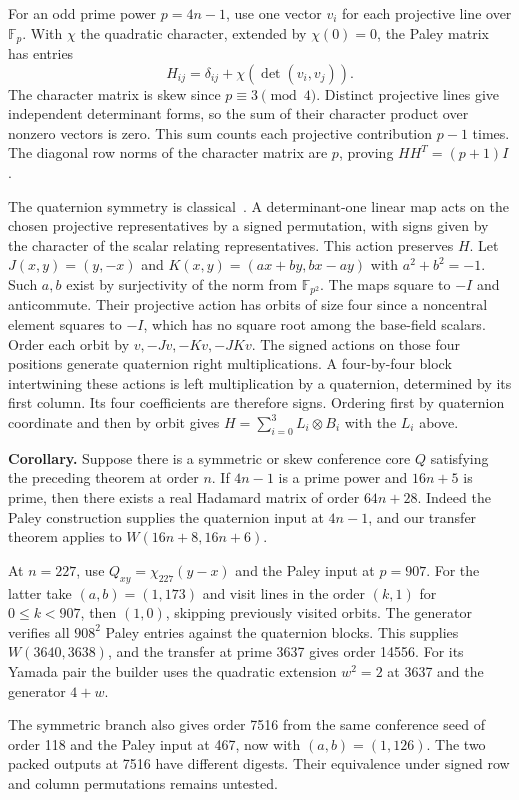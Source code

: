 \documentclass[10pt]{article}
\begin{document}
For an odd prime power $p=4n-1$, use one vector $v_i$ for each projective line over $\mathbb F_p$. With $\chi$ the quadratic character, extended by $\chi(0)=0$, the Paley matrix has entries
\[
 H_{ij}=\delta_{ij}+\chi(\det(v_i,v_j)).
\]
The character matrix is skew since $p\equiv3\pmod4$. Distinct projective lines give independent determinant forms, so the sum of their character product over nonzero vectors is zero. This sum counts each projective contribution $p-1$ times. The diagonal row norms of the character matrix are $p$, proving $HH^T=(p+1)I$.

The quaternion symmetry is classical~\cite{kantor,quaternion}. A determinant-one linear map acts on the chosen projective representatives by a signed permutation, with signs given by the character of the scalar relating representatives. This action preserves $H$. Let $J(x,y)=(y,-x)$ and $K(x,y)=(ax+by,bx-ay)$ with $a^2+b^2=-1$. Such $a,b$ exist by surjectivity of the norm from $\mathbb F_{p^2}$. The maps square to $-I$ and anticommute. Their projective action has orbits of size four since a noncentral element squares to $-I$, which has no square root among the base-field scalars. Order each orbit by $v,-Jv,-Kv,-JKv$. The signed actions on those four positions generate quaternion right multiplications. A four-by-four block intertwining these actions is left multiplication by a quaternion, determined by its first column. Its four coefficients are therefore signs. Ordering first by quaternion coordinate and then by orbit gives $H=\sum_{i=0}^3 L_i\otimes B_i$ with the $L_i$ above.

\noindent\textbf{Corollary.} Suppose there is a symmetric or skew conference core $Q$ satisfying the preceding theorem at order $n$. If $4n-1$ is a prime power and $16n+5$ is prime, then there exists a real Hadamard matrix of order $64n+28$. Indeed the Paley construction supplies the quaternion input at $4n-1$, and our transfer theorem applies to $W(16n+8,16n+6)$.

At $n=227$, use $Q_{xy}=\chi_{227}(y-x)$ and the Paley input at $p=907$. For the latter take $(a,b)=(1,173)$ and visit lines in the order $(k,1)$ for $0\le k<907$, then $(1,0)$, skipping previously visited orbits. The generator verifies all $908^2$ Paley entries against the quaternion blocks. This supplies $W(3640,3638)$, and the transfer at prime 3637 gives order 14556. For its Yamada pair the builder uses the quadratic extension $w^2=2$ at 3637 and the generator $4+w$.

The symmetric branch also gives order 7516 from the same conference seed of order 118 and the Paley input at 467, now with $(a,b)=(1,126)$. The two packed outputs at 7516 have different digests. Their equivalence under signed row and column permutations remains untested.
\end{document}
